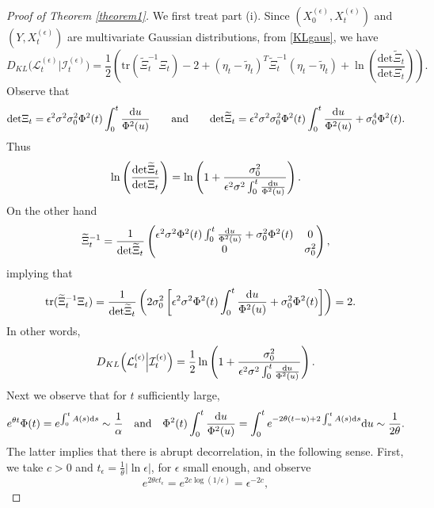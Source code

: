 \documentclass[12pt,thmsa]{article}
\newcommand{\ud}{\mathrm{d}}
\begin{document}
\begin{proof}[Proof of Theorem \ref{theorem1}] We first treat part (i). Since $ (X^{(\epsilon)}_0, X^{(\epsilon)}_t)$ and $ (Y, X^{(\epsilon)}_t)$ are multivariate Gaussian distributions, from \eqref{KLgaus}, we have
	\[
	D_{KL}\Big(\mathcal{L}^{(\epsilon)}_t\Big|\mathcal{I}^{(\epsilon)}_t\Big)= \frac{1}{2}\left(\mathrm{tr}(\widetilde{\Xi}_{t}^{-1}\Xi_{t})-2+(\eta_{t}-\widetilde{\eta}_{t})^{T}\widetilde{\Xi}_{t}^{-1}(\eta_{t}-\widetilde{\eta}_{t})+\ln\left(\frac{\mathrm{det }\widetilde{\Xi}_{t}}{\mathrm{det }\Xi_{t}}\right)\right).
	\]
	Observe that 
	\[
	\mathrm{det}\Xi_{t}=\epsilon^2\sigma^2\sigma_0^2\Phi^2(t)\int_0^{ t}\frac{{\rm d}u}{\Phi^2(u)} \qquad \textrm{and}\qquad \mathrm{det}\widetilde{\Xi}_{t}=\epsilon^2\sigma^2\sigma_0^2\Phi^2(t)\int_0^{ t}\frac{{\rm d}u}{\Phi^2(u)}+\sigma_0^4\Phi^2(t).
	\]
	Thus
	\[
	\ln \left(\frac{\mathrm{det}\widetilde{\Xi}_{t}}{\mathrm{det}\Xi_{t}}\right)=\ln\left(1+\frac{\sigma_0^2}{\epsilon^2\sigma^2\int_0^{ t}\frac{{\rm d}u}{\Phi^2(u)}}\right).
	\]
	On the other hand
	\[
	\widetilde{\Xi}_{t}^{-1}=\frac{1}{\mathrm{det}\widetilde{\Xi}_{t}}
	\begin{pmatrix}
		\epsilon^2\sigma^2\Phi^2(t)\int_0^{ t}\frac{{\rm d}u}{\Phi^2(u)}+\sigma_0^2\Phi^2(t)
		& 0\\
		0 & \sigma_0^2
	\end{pmatrix},
	\]
	implying that 
	\[
	\begin{split}
		\mathrm{tr}(\widetilde{\Xi}_{t}^{-1}\Xi_{t})&=\frac{1}{\mathrm{det}\widetilde{\Xi}_{t}}\left(2\sigma^2_0\left[\epsilon^2\sigma^2\Phi^2(t)\int_0^{ t}\frac{{\rm d}u}{\Phi^2(u)}+\sigma_0^2\Phi^2(t)\right]\right)=2.
	\end{split}
	\]
	In other words,
	\[
	D_{KL}\Big(\mathcal{L}^{(\epsilon)}_t\Big|\mathcal{I}^{(\epsilon)}_t\Big)=\frac{1}{2}\ln\left(1+\frac{\sigma_0^2}{\epsilon^2\sigma^2\int_0^{ t}\frac{{\rm d}u}{\Phi^2(u)}}\right).
	\]
	Next we observe that for $t$ sufficiently large,
	\begin{equation}\label{asymptotics}
		e^{\theta t}\Phi(t)= e^{\int_0^t A(s)\ud s}\sim \frac{1}{\alpha}  \quad \textrm{and}\quad \Phi^2(t)\int_0^{ t}\frac{{\rm d}u}{\Phi^2(u)}=\int_0^t e^{-2\theta (t-u)+2\int_u^{t} A(s){\rm d} s}{\rm d} u\sim \frac{1}{2\theta}. 
	\end{equation}
	The latter implies that there is abrupt decorrelation, in the following sense. First, we take $c>0$ and $t_\epsilon=\frac{1}{\theta}|\ln \epsilon|$, for $\epsilon$ small enough, and observe
	\[
	e^{2\theta c t_\epsilon}=e^{2 c \log(1/\epsilon)}=\epsilon^{-2 c},
\]
\end{proof}
\end{document}
